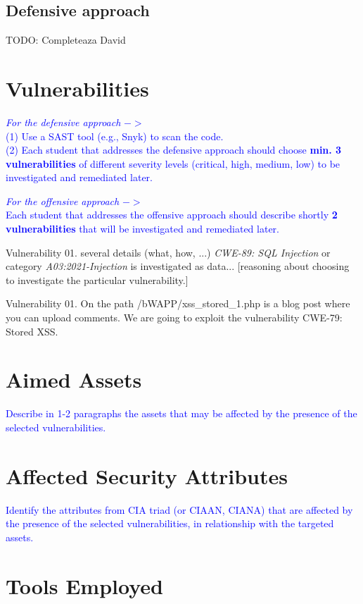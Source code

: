 \documentclass{article}
\begin{document}
\subsection{Defensive approach}
TODO: Completeaza David


\section{Vulnerabilities}
\label{}

\textcolor{blue}{\textit{For the defensive approach} $->$ \\(1) Use a SAST tool (e.g., Snyk) to scan the code.\\
    (2) Each student that addresses the defensive approach should choose \textbf{min. 3 vulnerabilities} of different severity levels (critical, high, medium, low) to be investigated and remediated later.}

\textcolor{blue}{\textit{For the offensive approach} $->$\\
    Each student that addresses the offensive approach should describe shortly \textbf{2 vulnerabilities} that will be investigated and remediated later.
}

Vulnerability 01. several details (what, how, ...) \textit{CWE-89: SQL Injection} or category \textit{A03:2021-Injection}  \cite{Vuln001} is investigated as data... [reasoning about choosing to investigate the particular vulnerability.]

Vulnerability 01. On the path /bWAPP/xss\_stored\_1.php is a blog post where you can upload comments.
We are going to exploit the vulnerability CWE-79: Stored XSS.


\section{Aimed Assets}
\label{}

\textcolor{blue}{Describe in 1-2 paragraphs the assets that may be affected by the presence of the selected vulnerabilities.
}

\section{Affected Security Attributes}
\label{}

\textcolor{blue}{Identify the attributes from CIA triad (or CIAAN, CIANA) that are affected by the presence of the selected vulnerabilities, in relationship with the targeted assets.
}


\section{Tools Employed}
\label{}
\end{document}
